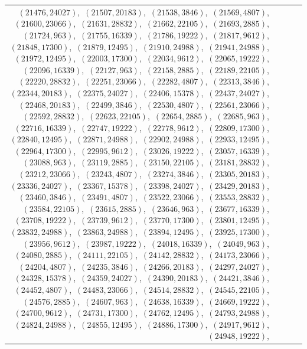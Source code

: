 \documentclass[11pt]{article}
\begin{document}
\begin{longtable}{@{}rrl>{\raggedright\arraybackslash}p{}@{}}
$(21476,24027)$,\allowbreak\ $(21507,20183)$,\allowbreak\ $(21538,3846)$,\allowbreak\ $(21569,4807)$,\allowbreak\ $(21600,23066)$,\allowbreak\ $(21631,28832)$,\allowbreak\ $(21662,22105)$,\allowbreak\ $(21693,2885)$,\allowbreak\ $(21724,963)$,\allowbreak\ $(21755,16339)$,\allowbreak\ $(21786,19222)$,\allowbreak\ $(21817,9612)$,\allowbreak\ $(21848,17300)$,\allowbreak\ $(21879,12495)$,\allowbreak\ $(21910,24988)$,\allowbreak\ $(21941,24988)$,\allowbreak\ $(21972,12495)$,\allowbreak\ $(22003,17300)$,\allowbreak\ $(22034,9612)$,\allowbreak\ $(22065,19222)$,\allowbreak\ $(22096,16339)$,\allowbreak\ $(22127,963)$,\allowbreak\ $(22158,2885)$,\allowbreak\ $(22189,22105)$,\allowbreak\ $(22220,28832)$,\allowbreak\ $(22251,23066)$,\allowbreak\ $(22282,4807)$,\allowbreak\ $(22313,3846)$,\allowbreak\ $(22344,20183)$,\allowbreak\ $(22375,24027)$,\allowbreak\ $(22406,15378)$,\allowbreak\ $(22437,24027)$,\allowbreak\ $(22468,20183)$,\allowbreak\ $(22499,3846)$,\allowbreak\ $(22530,4807)$,\allowbreak\ $(22561,23066)$,\allowbreak\ $(22592,28832)$,\allowbreak\ $(22623,22105)$,\allowbreak\ $(22654,2885)$,\allowbreak\ $(22685,963)$,\allowbreak\ $(22716,16339)$,\allowbreak\ $(22747,19222)$,\allowbreak\ $(22778,9612)$,\allowbreak\ $(22809,17300)$,\allowbreak\ $(22840,12495)$,\allowbreak\ $(22871,24988)$,\allowbreak\ $(22902,24988)$,\allowbreak\ $(22933,12495)$,\allowbreak\ $(22964,17300)$,\allowbreak\ $(22995,9612)$,\allowbreak\ $(23026,19222)$,\allowbreak\ $(23057,16339)$,\allowbreak\ $(23088,963)$,\allowbreak\ $(23119,2885)$,\allowbreak\ $(23150,22105)$,\allowbreak\ $(23181,28832)$,\allowbreak\ $(23212,23066)$,\allowbreak\ $(23243,4807)$,\allowbreak\ $(23274,3846)$,\allowbreak\ $(23305,20183)$,\allowbreak\ $(23336,24027)$,\allowbreak\ $(23367,15378)$,\allowbreak\ $(23398,24027)$,\allowbreak\ $(23429,20183)$,\allowbreak\ $(23460,3846)$,\allowbreak\ $(23491,4807)$,\allowbreak\ $(23522,23066)$,\allowbreak\ $(23553,28832)$,\allowbreak\ $(23584,22105)$,\allowbreak\ $(23615,2885)$,\allowbreak\ $(23646,963)$,\allowbreak\ $(23677,16339)$,\allowbreak\ $(23708,19222)$,\allowbreak\ $(23739,9612)$,\allowbreak\ $(23770,17300)$,\allowbreak\ $(23801,12495)$,\allowbreak\ $(23832,24988)$,\allowbreak\ $(23863,24988)$,\allowbreak\ $(23894,12495)$,\allowbreak\ $(23925,17300)$,\allowbreak\ $(23956,9612)$,\allowbreak\ $(23987,19222)$,\allowbreak\ $(24018,16339)$,\allowbreak\ $(24049,963)$,\allowbreak\ $(24080,2885)$,\allowbreak\ $(24111,22105)$,\allowbreak\ $(24142,28832)$,\allowbreak\ $(24173,23066)$,\allowbreak\ $(24204,4807)$,\allowbreak\ $(24235,3846)$,\allowbreak\ $(24266,20183)$,\allowbreak\ $(24297,24027)$,\allowbreak\ $(24328,15378)$,\allowbreak\ $(24359,24027)$,\allowbreak\ $(24390,20183)$,\allowbreak\ $(24421,3846)$,\allowbreak\ $(24452,4807)$,\allowbreak\ $(24483,23066)$,\allowbreak\ $(24514,28832)$,\allowbreak\ $(24545,22105)$,\allowbreak\ $(24576,2885)$,\allowbreak\ $(24607,963)$,\allowbreak\ $(24638,16339)$,\allowbreak\ $(24669,19222)$,\allowbreak\ $(24700,9612)$,\allowbreak\ $(24731,17300)$,\allowbreak\ $(24762,12495)$,\allowbreak\ $(24793,24988)$,\allowbreak\ $(24824,24988)$,\allowbreak\ $(24855,12495)$,\allowbreak\ $(24886,17300)$,\allowbreak\ $(24917,9612)$,\allowbreak\ $(24948,19222)$,\allowbreak\ 
\end{longtable}
\end{document}
